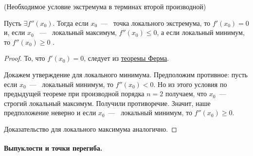 \begin{theorem}
	\hypertarget{thrm5.25}{(Необходимое условие экстремума в терминах второй производной)} Пусть $\exists f''(x_{0})$. Тогда если $x_{0}$~---~ точка локального экстремума, то $f'(x_{0}) = 0$ и, если $x_{0}$ ~---~ локальный максимум, $f''(x_{0}) \leq 0$, а если локальный минимум, то $f''(x_{0}) \geq 0$ .
\end{theorem}
\begin{proof}
	То, что $f'(x_{0}) = 0$, следует из \hyperlink{thrm5.9}{теоремы Ферма}. 
	
	Докажем утверждение для локального минимума. Предположим противное: пусть если $x_{0}$~---~ локальный минимум, то $f''(x_{0}) < 0$. Но из этого условия по предыдущей теореме при производной порядка $n = 2$ получаем, что $x_{0}$~---~ строгий локальный максимум. Получили противоречие. Значит, наше предположение неверно и если $x_{0}$~---~ локальный минимум, то $f''(x_{0}) \geq 0$.
	
	Доказательство для локального максимума аналогично.  
\end{proof}

\paragraph{Выпуклости и точки перегиба.}



